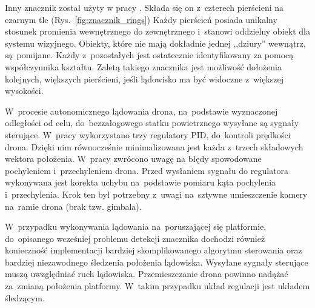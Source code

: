 Inny znacznik został użyty w pracy \cite{Rings}. 
Składa się on z~czterech pierścieni na czarnym tle (Rys.~\ref{fig:znacznik_rings})
Każdy pierścień posiada unikalny stosunek promienia wewnętrznego do zewnętrznego i~stanowi oddzielny obiekt dla systemu wizyjnego. 
Obiekty, które nie mają dokładnie jednej ,,dziury'' wewnątrz, są~pomijane. 
Każdy z~pozostałych jest ostatecznie identyfikowany za pomocą współczynnika kształtu. 
Zaletą takiego znacznika jest możliwość dołożenia kolejnych, większych pierścieni, jeśli lądowisko ma być widoczne z~większej wysokości.


W~procesie autonomicznego lądowania drona, na~podstawie wyznaczonej odległości od celu, do~bezzałogowego statku powietrznego wysyłane są sygnały sterujące. 
W~pracy \cite{Sudevan} wykorzystano trzy regulatory PID, do~kontroli prędkości drona. 
Dzięki nim równocześnie minimalizowana jest każda z~trzech składowych wektora położenia. 
W~pracy \cite{Rings} zwrócono uwagę na błędy spowodowane pochyleniem i~przechyleniem drona. 
Przed wysłaniem sygnału do regulatora wykonywana jest korekta uchybu na~podstawie pomiaru kąta pochylenia i~przechylenia. 
Krok ten był potrzebny z~uwagi na~sztywne umieszczenie kamery na~ramie drona (brak tzw. gimbala). 


W~przypadku wykonywania lądowania na~poruszającej się platformie, do~opisanego wcześniej problemu detekcji znacznika dochodzi również konieczność implementacji bardziej skomplikowanego algorytmu sterowania oraz bardziej niezawodnego śledzenia położenia lądowiska. 
Wysyłane sygnały sterujące muszą uwzględniać ruch lądowiska. 
Przemieszczanie drona powinno nadążać za~zmianą położenia platformy. 
W~takim przypadku układ regulacji jest układem śledzącym.

